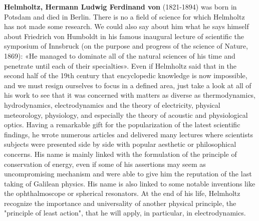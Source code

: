 \textbf{Helmholtz, Hermann Ludwig Ferdinand von} (1821-1894) was born in Potsdam and died in Berlin. There is no a field of science for which Helmholtz has not made some research. We could also say about him what he says himself about Friedrich von Humboldt in his famous inaugural lecture of scientific the symposium of Innsbruck (on the purpose and progress of the science of Nature, 1869): «He managed to dominate all of the natural sciences of his time and penetrate until each of their specialties». Even if Helmholtz said that in the second half of the 19th century that encyclopedic knowledge is now impossible, and we must resign ourselves to focus in a defined area, just take a look at all of his work to see that it was concerned with matters as diverse as thermodynamics, hydrodynamics, electrodynamics and the theory of electricity, physical meteorology, physiology, and especially the theory of acoustic and physiological optics. Having a remarkable gift for the popularization of the latest scientific findings, he wrote numerous articles and delivered many lectures where scientists subjects were presented side by side with popular aesthetic or philosophical concerns. His name is mainly linked with the formulation of the principle of conservation of energy, even if some of his assertions may seem as uncompromising mechanism and were able to give him the reputation of the last taking of Galilean physics. His name is also linked to some notable inventions like the ophthalmoscope or spherical resonators. At the end of his life, Helmholtz recognize the importance and universality of another physical principle, the "principle of least action", that he will apply, in particular, in electrodynamics.

